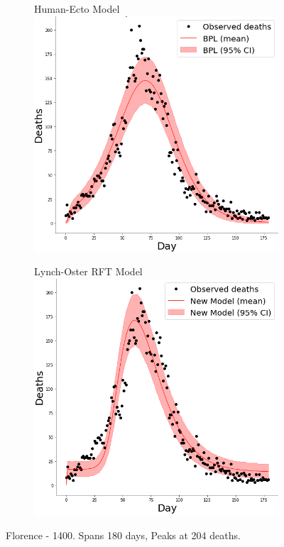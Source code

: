 \documentclass [letterpaper, 12pt] {article}
\begin{document}
\begin{figure}[H]
\begin{subfigure}{0.5\textwidth}
	\end{subfigure}
	\begin{subfigure}{0.5\textwidth}
		\centering
		Human-Ecto Model
		\includegraphics[width=\linewidth]{h_ecto/florence}
	\end{subfigure}\hspace{\fill}
	\begin{subfigure}{0.5\textwidth}
		\centering
		Lynch-Oster RFT Model
		\includegraphics[width=\linewidth]{rats2/florence}
	\end{subfigure}
	\caption{Florence - 1400. Spans 180 days, Peaks at 204 deaths.}
\end{figure}
\end{document}
